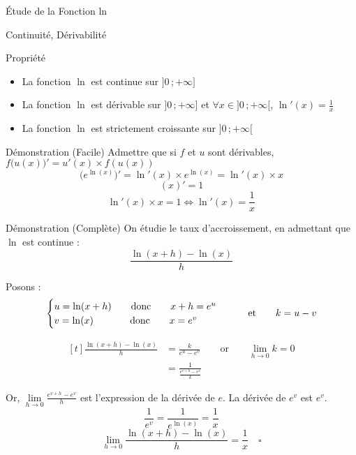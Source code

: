 \documentclass{cours}
\begin{document}
    \begin{Gpartie}{Étude de la Fonction ln}
        \begin{Spartie}{Continuité, Dérivabilité}
            \begin{SSpartie}{Propriété}
                \begin{itemize}
                    \item La fonction $\ln$ est continue sur $\big]0\,;+\infty\big]$
                    \item La fonction $\ln$ est dérivable sur $\big]0\,;+\infty\big]$ et $\forall x\in\big]0\,;+\infty\big[$, $\ln'(x)=\frac{1}{x}$
                    \item La fonction $\ln$ est strictement croissante sur $\big]0\,;+\infty\big[$
                \end{itemize}
                \begin{SSSpartie}{Démonstration (Facile)}
                    Admettre que si $f$ et $u$ sont dérivables, $f\big(u(x)\big)'=u'(x)\times f(u(x))$
                    \[\big(e^{\ln(x)}\big)'=\ln'(x)\times e^{\ln(x)}=\ln'(x)\times x\]
                    \[(x)'=1\]
                    \[\ln'(x)\times x=1\iff\ln'(x)=\frac{1}{x}\]
                    
                \end{SSSpartie}
                \begin{SSSpartie}{Démonstration (Complète)} 
                    On étudie le taux d'accroissement, en admettant que $\ln$ est continue :
                    \[\frac{\ln(x+h)-\ln(x)}{h}\]

                    Posons :
                    \[\begin{cases}
                        u=\ln(x+h)\qquad\text{donc}\qquad x+h=e^u \\ v=\ln(x)\phantom{+h)}\text{\qquad donc\qquad} x=e^v
                    \end{cases}\qquad\text{et}\qquad k=u-v\]

                    \[\begin{aligned}[t]
                        \frac{\ln(x+h)-\ln(x)}{h}&=\frac{k}{e^u-e^v}\qquad\text{or}\qquad\lim_{h\to0}k=0 \\
                        &=\frac{1}{\frac{e^{v+h}-e^v}{k}}
                    \end{aligned}\]

                    Or, $\lim\limits_{h\to0}\frac{e^{v+h}-e^v}{h}$ est l'expression de la dérivée de $e$. La dérivée de $e^v$ est $e^v$.
                    \[\frac{1}{e^v}=\frac{1}{e^{\ln(x)}}=\frac{1}{x}\]
                    \[\lim\limits_{h\to 0}\frac{\ln(x+h)-\ln(x)}{h}=\frac{1}{x}\quad\square\]


\end{SSSpartie}
\end{SSpartie}
\end{Spartie}
\end{Gpartie}
\end{document}

